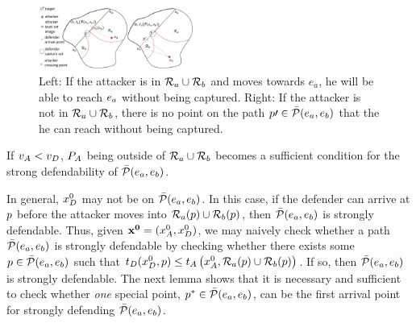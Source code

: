 \begin{figure}
\centering
\includegraphics[width=0.45\textwidth]{"fig/Ra Rb"}
\caption{Left: If the attacker is in $\mathcal{R}_a\cup\mathcal{R}_b$ and moves towards $e_a$, he  will be able to reach $e_a$ without being captured. Right: If the attacker is not in $\mathcal{R}_a\cup\mathcal{R}_b$, there is no point on the path $p\prime\in\bar{\mathcal{P}}(e_a,e_b)$ that the he can reach without being captured.}
\label{fig:lemma1}
\end{figure}

If $v_A<v_D$, $P_A$ being outside of $\mathcal{R}_a \cup \mathcal{R}_b$ becomes a sufficient condition for the strong defendability of $\bar{\mathcal{P}}(e_a,e_b)$.

In general, $x_D^0$ may not be on $\bar{\mathcal{P}}(e_a,e_b)$. In this case, if the defender can arrive at $p$ before the attacker moves into $\mathcal{R}_a(p)\cup\mathcal{R}_b(p)$, then $\bar{\mathcal{P}}(e_a,e_b)$ is strongly defendable. Thus, given $\mathbf{x^0} = (x_A^0,x_D^0)$, we may naively check whether a path $\bar{\mathcal{P}}(e_a,e_b)$ is strongly defendable by checking whether there exists some $p\in\bar{\mathcal{P}}(e_a,e_b)$ such that $t_D(x_D^0, p)\le t_A\left(x_A^0,\mathcal{R}_a(p)\cup\mathcal{R}_b(p)\right)$. If so, then $\bar{\mathcal{P}}(e_a,e_b)$ is strongly defendable. The next lemma shows that it is necessary and sufficient to check whether \textit{one} special point, $p^*\in\bar{\mathcal{P}}(e_a,e_b)$, can be the first arrival point for strongly defending $\bar{\mathcal{P}}(e_a,e_b)$.

